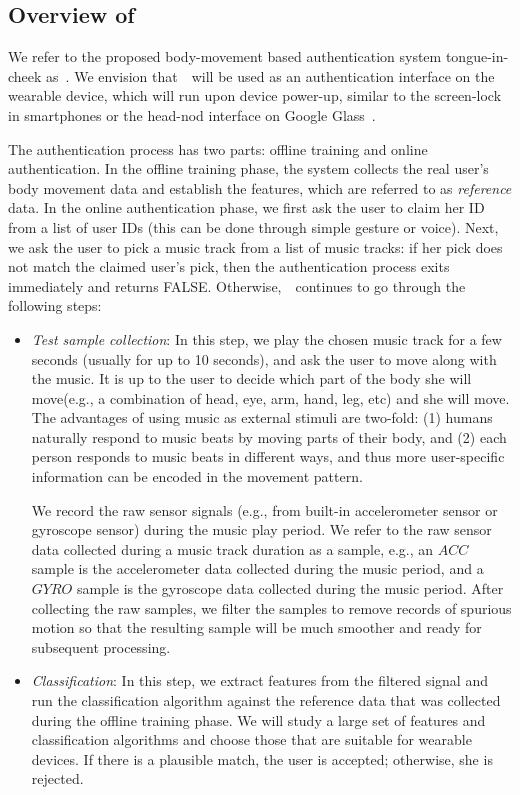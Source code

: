 \subsection{Overview of ~\systemname}

We refer to the proposed body-movement based authentication system tongue-in-cheek as~\systemname. We envision that~\systemname~will be used as an authentication interface on the wearable device, which will run upon device power-up, similar to the screen-lock in smartphones or the head-nod interface on Google Glass~\cite{googleglass}.  %

The authentication process has two parts: offline training and online authentication. In the offline training phase, the system collects the real user's body movement data and establish the features, which are referred to as \emph{reference} data. In the online authentication phase, we first ask the user to claim her ID from a list of user IDs (this can be done through simple gesture or voice). Next, we ask the user to pick a music track from a list of music tracks: if her pick does not match the claimed user's pick, then the authentication process exits immediately and returns FALSE. Otherwise,~\systemname~continues to go through the following steps:
\begin{itemize}
\vspace{-2pt}\item {\em Test sample collection}: In this step, we play the chosen music track for a few seconds (usually for up to 10 seconds), and ask the user to move along with the music. It is up to the user to decide which part of the body she will move(e.g., a combination of head, eye, arm, hand, leg, etc) and she will move. The advantages of using music as external stimuli are two-fold: (1) humans naturally respond to music beats by moving parts of their body, and (2) each person responds to music beats in different ways, and thus more user-specific information can be encoded in the movement pattern.

We record the raw sensor signals (e.g., from built-in accelerometer sensor or gyroscope sensor) during the music play period. We refer to the raw sensor data collected during a music track duration as a sample, e.g., an $ACC$ sample is the accelerometer data collected during the music period, and a $GYRO$ sample is the gyroscope data collected during the music period. After collecting the raw samples, we filter the samples to remove records of spurious motion so that the resulting sample will be much smoother and ready for subsequent processing.

\vspace{-2pt}\item {\em Classification}: In this step, we extract features from the filtered signal and run the classification algorithm against the reference data that was collected during the offline training phase. We will study a large set of features and classification algorithms and choose those that are suitable for wearable devices. If there is a plausible match, the user is accepted; otherwise, she is rejected.
\end{itemize}

